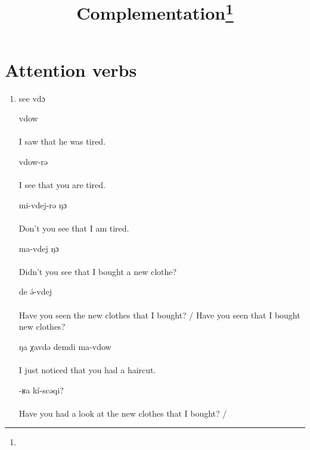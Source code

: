 \documentclass[oldfontcommands,oneside,a4paper,11pt]{article}
\newcommand{\ipa}[1]{{\phon #1}} %
\begin{document}
 

\title{Complementation\footnote{
} }
\maketitle
\linenumbers

\section{Attention verbs}

\begin{enumerate}
\item see \ipa{vdɔ}

\begin{exe}
\ex
\gll [ŋa tə rka-sə] vdow \\
\\
\glt I saw that he was tired.
\end{exe}

\begin{exe}
\ex
\gll [ŋa ɲi rka-sə ci] vdow-rə \\
\\
\glt I see that you are tired. %
\end{exe}

\begin{exe}
\ex
\gll [ŋa   rka-sə ci]  mi-vdej-rə ŋɔ \\
\\
\glt Don't you see that I am tired. %
\end{exe}

\begin{exe}
\ex
{}  ma-vdej  ŋɔ \\
\\
\glt Didn't you see that I bought a new clothe? %
\end{exe}

\begin{exe}
\ex
{} de ə́-vdej    \\
\\
\glt Have you seen the new clothes that I bought? / Have you seen that I bought new clothes?%
\end{exe}
\begin{exe}
\ex
\gll [ɲi ʁə nə-praˠ-sə] ŋa χavdə demdi   ma-vdow  \\
\\
\glt  I just noticed that you had a haircut.
\end{exe}
\begin{exe}
\ex
{}-ʁa kí-scəqi?    \\
\\
\glt Have you had a look at the new clothes that I bought? /  %
\end{exe}



\end{enumerate}
\end{document}
